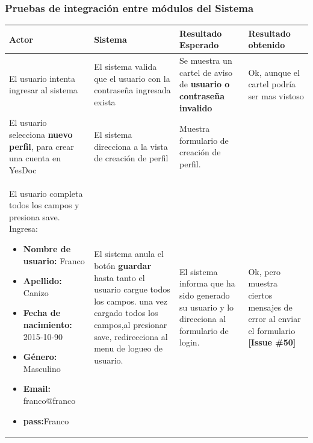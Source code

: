 \subsubsection{Pruebas  de  integración  entre módulos del Sistema}


\begin{longtable}{|p{4cm}|p{4cm}|p{4cm}|p{3cm}|}
\hline
Actor  & Sistema& Resultado Esperado & Resultado obtenido \\ \hline

El usuario intenta ingresar al sistema & El sistema valida que el usuario con la contraseña ingresada exista 
& Se muestra un cartel de aviso de \textbf{usuario o contraseña invalido} 
& Ok, aunque el cartel podría ser mas vistoso 
\\ \hline



El usuario selecciona \textbf{nuevo perfil}, para
crear una cuenta en YesDoc 
& El sistema direcciona a la vista de creación de perfil
& Muestra formulario de creación de perfil.
&
\\ \hline



 El usuario completa todos los campos y presiona save.
 Ingresa:
\begin{itemize}
	\item \textbf{Nombre de usuario:} Franco
	\item \textbf{Apellido:} Canizo
	\item \textbf{Fecha de nacimiento: }2015-10-90
	\item \textbf{Género: }Masculino
	\item \textbf{Email: }franco@franco
	\item \textbf{pass:}Franco

\end{itemize}
& El sistema anula el botón \textbf{guardar }hasta tanto el usuario cargue todos los campos. una vez cargado todos los campos,al presionar save, redirecciona al menu
de logueo de usuario.
& El sistema informa que ha sido generado su usuario y lo direcciona al formulario de login.
& Ok, pero muestra ciertos mensajes de error al enviar el formulario \textbf{[Issue \#50]}
\\ \hline




\end{longtable}
